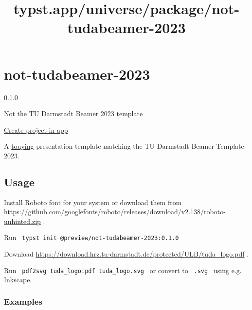 \title{typst.app/universe/package/not-tudabeamer-2023}

\label{banner}
\label{template-thumbnail}

\section{not-tudabeamer-2023}\label{not-tudabeamer-2023}

{ 0.1.0 }

Not the TU Darmstadt Beamer 2023 template

\href{/app?template=not-tudabeamer-2023&version=0.1.0}{Create project in
app}

\label{readme}
A \href{https://github.com/touying-typ/touying}{touying} presentation
template matching the TU Darmstadt Beamer Template 2023.

\subsection{Usage}\label{usage}

Install Roboto font for your system or download them from
\url{https://github.com/googlefonts/roboto/releases/download/v2.138/roboto-unhinted.zip}
.

Run \texttt{\ typst\ init\ @preview/not-tudabeamer-2023:0.1.0\ }

Download
\url{https://download.hrz.tu-darmstadt.de/protected/ULB/tuda_logo.pdf} .

Run \texttt{\ pdf2svg\ tuda\_logo.pdf\ tuda\_logo.svg\ } or convert to
\texttt{\ .svg\ } using e.g. Inkscape.

\subsubsection{Examples}\label{examples}

\begin{Shaded}
\begin{Highlighting}[]

\NormalTok{  )}
\NormalTok{)}





\end{Highlighting}
\end{Shaded}


